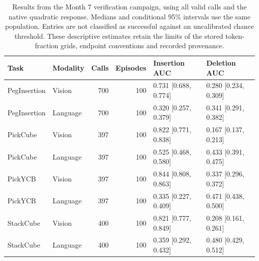 \begin{table}[htbp]
\centering\small
\setlength{\tabcolsep}{3.5pt}
\caption{Results from the Month 7 verification campaign, using all valid calls and the native quadratic response. Medians and conditional 95\% intervals use the same population. Entries are not classified as successful against an uncalibrated chance threshold. These descriptive estimates retain the limits of the stored token-fraction grids, endpoint conventions and recorded provenance.}
\label{tab:faithfulness}
\begin{tabular}{llrrll}
\toprule
Task & Modality & Calls & Episodes & Insertion AUC & Deletion AUC \\
\midrule
PegInsertion & Vision & 700 & 100 & 0.731 [0.688, 0.774] & 0.280 [0.234, 0.309] \\
PegInsertion & Language & 700 & 100 & 0.320 [0.257, 0.379] & 0.341 [0.291, 0.382] \\
PickCube & Vision & 397 & 100 & 0.822 [0.771, 0.838] & 0.167 [0.137, 0.213] \\
PickCube & Language & 397 & 100 & 0.525 [0.468, 0.580] & 0.433 [0.391, 0.475] \\
PickYCB & Vision & 397 & 100 & 0.844 [0.808, 0.863] & 0.337 [0.296, 0.372] \\
PickYCB & Language & 397 & 100 & 0.335 [0.227, 0.409] & 0.471 [0.438, 0.500] \\
StackCube & Vision & 400 & 100 & 0.821 [0.777, 0.849] & 0.208 [0.161, 0.261] \\
StackCube & Language & 400 & 100 & 0.359 [0.292, 0.432] & 0.480 [0.429, 0.512] \\
\bottomrule
\end{tabular}
\end{table}
